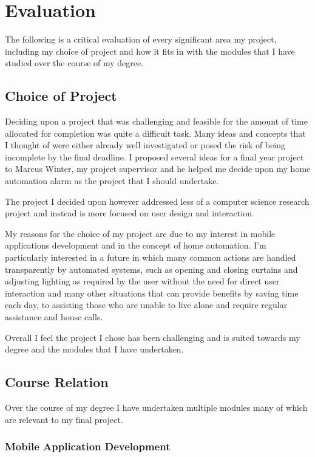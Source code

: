 \section{Evaluation}\label{evaluation}

The following is a critical evaluation of every significant area my
project, including my choice of project and how it fits in with the
modules that I have studied over the course of my degree.

\subsection{Choice of Project}\label{choice-of-project}

Deciding upon a project that was challenging and feasible for the amount
of time allocated for completion was quite a difficult task. Many ideas
and concepts that I thought of were either already well investigated or
posed the risk of being incomplete by the final deadline. I proposed
several ideas for a final year project to Marcus Winter, my project
supervisor and he helped me decide upon my home automation alarm as the
project that I should undertake.

The project I decided upon however addressed less of a computer science
research project and instead is more focused on user design and
interaction.

My reasons for the choice of my project are due to my interest in mobile
applications development and in the concept of home automation. I'm
particularly interested in a future in which many common actions are
handled transparently by automated systems, such as opening and closing
curtains and adjusting lighting as required by the user without the need
for direct user interaction and many other situations that can provide
benefits by saving time each day, to assisting those who are unable to
live alone and require regular assistance and house calls.

Overall I feel the project I chose has been challenging and is suited
towards my degree and the modules that I have undertaken.

\subsection{Course Relation}\label{course-relation}

Over the course of my degree I have undertaken multiple modules many of
which are relevant to my final project.

\subsubsection{Mobile Application
Development}\label{mobile-application-development}

